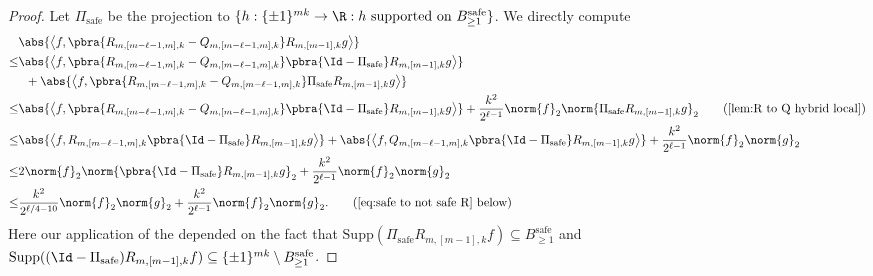 \begin{proof}
    Let $\Pi_{\mathrm{safe}}$ be the projection to $\{h:\{\pm1\}^{mk}\to\R:h\text{ supported on }B_{\geq1}^{\mathrm{safe}}\}$. We directly compute
    \begin{align*}
        &\abs{\left\langle f,\pbra{R_{m,[m-\ell-1,m],k}-Q_{m,[m-\ell-1,m],k}}R_{m,[m-1],k}g\right\rangle }\\
        \leq&\abs{\left\langle f,\pbra{R_{m,[m-\ell-1,m],k}-Q_{m,[m-\ell-1,m],k}}\pbra{\Id-\Pi_{\mathrm{safe}}}R_{m,[m-1],k}g\right\rangle }\\
        &\;\;+\abs{\left\langle f,\pbra{R_{m,[m-\ell-1,m],k}-Q_{m,[m-\ell-1,m],k}}\Pi_{\mathrm{safe}}R_{m,[m-1],k}g\right\rangle}\\
        \leq&\abs{\left\langle f,\pbra{R_{m,[m-\ell-1,m],k}-Q_{m,[m-\ell-1,m],k}}\pbra{\Id-\Pi_{\mathrm{safe}}}R_{m,[m-1],k}g\right\rangle }+\frac{k^2}{2^{\ell-1}}\norm{f}_2\norm{\Pi_{\mathrm{safe}}R_{m,[m-1],k}g}_2\tag{\Cref{lem:R to Q hybrid local}}\\
        \leq&\abs{\left\langle f,R_{m,[m-\ell-1,m],k}\pbra{\Id-\Pi_{\mathrm{safe}}}R_{m,[m-1],k}g\right\rangle}+\abs{\left\langle f,Q_{m,[m-\ell-1,m],k}\pbra{\Id-\Pi_{\mathrm{safe}}}R_{m,[m-1],k}g\right\rangle}+\frac{k^2}{2^{\ell-1}}\norm{f}_2\norm{g}_2\\
        \leq&2\norm{f}_2\norm{\pbra{\Id-\Pi_{\mathrm{safe}}}R_{m,[m-1],k}g}_2+\frac{k^2}{2^{\ell-1}}\norm{f}_2\norm{g}_2\\
        \leq&\frac{k^2}{2^{\ell/4-10}}\norm{f}_2\norm{g}_2+\frac{k^2}{2^{\ell-1}}\norm{f}_2\norm{g}_2.\tag{\Cref{eq:safe to not safe R} below}
    \end{align*}
    Here our application of the  depended on the fact that $\mathrm{Supp}(\Pi_{\mathrm{safe}}R_{m,[m-1],k}f)\subseteq B_{\geq1}^{\mathrm{safe}}$ and $\mathrm{Supp}((\Id-\Pi_{\mathrm{safe}})R_{m,[m-1],k}f)\subseteq \{\pm1\}^{mk}\setminus B_{\geq1}^{\mathrm{safe}}$.
    

\end{proof}
